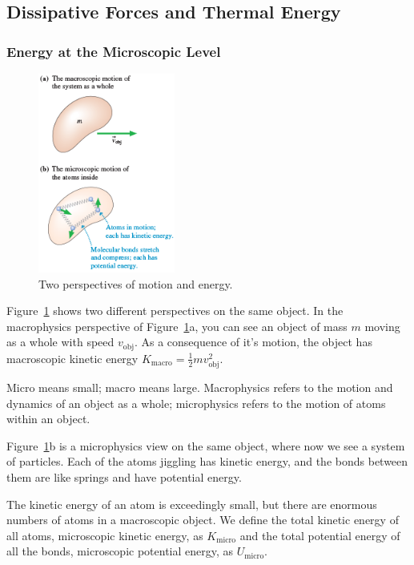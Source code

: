 \subsection{Dissipative Forces and Thermal Energy}

\subsubsection{Energy at the Microscopic Level}

\begin{figure}
    \centering
    \includegraphics[width=0.4\textwidth]{../figures/micro-vs-macro.png}
    \caption{Two perspectives of motion and energy.}
    \label{fig:micro-vs-macro}
\end{figure}

Figure~\ref{fig:micro-vs-macro} shows two different perspectives on the same object.
In the macrophysics perspective of Figure~\ref{fig:micro-vs-macro}a, you can see an object of 
mass $m$ moving as a whole with speed $v_\mathrm{obj}$. As a consequence of it's motion,
the object has macroscopic kinetic energy $K_\mathrm{macro} = \frac{1}{2}mv_\mathrm{obj}^2$.
\begin{remark}
    Micro means small; macro means large. Macrophysics refers to the motion and dynamics
    of an object as a whole; microphysics refers to the motion of atoms within an object.
\end{remark}
Figure~\ref{fig:micro-vs-macro}b is a microphysics view on the same object, where now
we see a system of particles. Each of the atoms jiggling has kinetic energy, and the bonds
between them are like springs and have potential energy.

The kinetic energy of an atom is exceedingly small, but there are enormous numbers of atoms in a 
macroscopic object. We define the total kinetic energy of all atoms, microscopic kinetic energy,
as $K_\mathrm{micro}$ and the total potential energy of all the bonds, microscopic potential energy,
as $U_\mathrm{micro}$.


